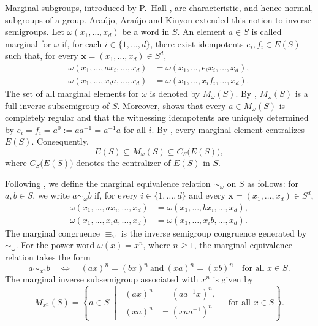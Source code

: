\documentclass[11pt,a4paper,reqno]{amsart}
\newcommand{\Mn}{M_{x^n}}
\newcommand{\cent}[1]{C_{#1}\bigl(E(#1)\bigr)}
\numberwithin{equation}{section}
\begin{document}
Marginal subgroups, introduced by P.~Hall \cite{Hall}, are characteristic, and hence normal, subgroups of a group. Ara\'ujo, Ara\'ujo and Kinyon \cite{AAK} extended this notion to inverse semigroups. Let $\omega(x_1,\ldots,x_d)$ be a word in $S$. An element $a\in S$ is called marginal for $\omega$ if, for each $i\in\{1,\ldots,d\}$, there exist idempotents $e_i,f_i\in E(S)$ such that, for every $\boldsymbol{x}=(x_1,\ldots,x_d)\in S^d$,
\begin{align}
\omega(x_1,\ldots,ax_i,\ldots,x_d) & = \omega(x_1,\ldots,e_ix_i,\ldots,x_d), \label{eq:def-left}\\
\omega(x_1,\ldots,x_ia,\ldots,x_d) & = \omega(x_1,\ldots,x_if_i,\ldots,x_d). \label{eq:def-right}
\end{align}
The set of all marginal elements for $\omega$ is denoted by $M_\omega(S)$. By \cite[Theorem~1]{AAK}, $M_\omega(S)$ is a full inverse subsemigroup of $S$. Moreover, \cite[Lemma~4]{AAK} shows that every $a\in M_\omega(S)$ is completely regular and that the witnessing idempotents are uniquely determined by $e_i=f_i=a^0:=aa^{-1}=a^{-1}a$ for all $i$. By \cite[Lemma~6]{AAK}, every marginal element centralizes $E(S)$. Consequently,
\begin{equation}\label{eq:bounds}
E(S)\subseteq M_\omega(S)\subseteq \cent S,
\end{equation}
where $\cent S$ denotes the centralizer of $E(S)$ in $S$.


Following \cite[Section 5]{AAK}, we define the marginal equivalence relation $\sim_\omega$ on $S$ as follows: for $a,b\in S$,
we write $a\sim_\omega b$ if, for every $i\in\{1,\ldots,d\}$ and every
$\boldsymbol{x}=(x_1,\ldots,x_d)\in S^d$,
\[
\begin{aligned}
\omega(x_1,\ldots,ax_i,\ldots,x_d) &=\omega(x_1,\ldots,bx_i,\ldots,x_d),\\
\omega(x_1,\ldots,x_i a,\ldots,x_d) &=\omega(x_1,\ldots,x_i b,\ldots,x_d).
\end{aligned}
\]
The marginal congruence $\equiv_\omega$ is the inverse semigroup congruence generated by $\sim_\omega$. For the power word $\omega(x)=x^n$, where $n\ge1$, the marginal
equivalence relation takes the form
\[
a\sim_{x^n}b \quad\Longleftrightarrow\quad (ax)^n=(bx)^n \ \text{and}\ (xa)^n=(xb)^n \quad\text{for all }x\in S.
\]
The marginal inverse subsemigroup associated with $x^n$ is given by
\begin{equation}\label{eq:power-margin}
\Mn(S)=
\left\{
a\in S \;\middle|\;
\begin{aligned}
(ax)^n&=(aa^{-1}x)^n,\\
(xa)^n&=(xaa^{-1})^n
\end{aligned}
\quad\text{for all }x\in S
\right\}.
\end{equation}
\end{document}

